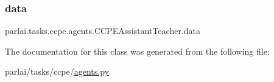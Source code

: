 \subsubsection{\texorpdfstring{data}{data}}
{\footnotesize\ttfamily parlai.\+tasks.\+ccpe.\+agents.\+C\+C\+P\+E\+Assistant\+Teacher.\+data}



The documentation for this class was generated from the following file\+:\begin{DoxyCompactItemize}
\item 
parlai/tasks/ccpe/\hyperlink{parlai_2tasks_2ccpe_2agents_8py}{agents.\+py}\end{DoxyCompactItemize}
